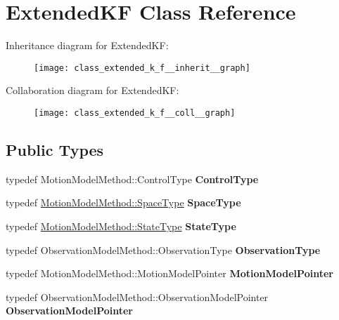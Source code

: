 \hypertarget{class_extended_k_f}{\section{\-Extended\-K\-F \-Class \-Reference}
\label{class_extended_k_f}
}


\-Inheritance diagram for \-Extended\-K\-F\-:
\nopagebreak
\begin{figure}[H]
\begin{center}
\leavevmode
\texttt{[image: class\_extended\_k\_f\_\_inherit\_\_graph]}
\end{center}
\end{figure}


\-Collaboration diagram for \-Extended\-K\-F\-:
\nopagebreak
\begin{figure}[H]
\begin{center}
\leavevmode
\texttt{[image: class\_extended\_k\_f\_\_coll\_\_graph]}
\end{center}
\end{figure}
\subsection*{\-Public \-Types}
\begin{DoxyCompactItemize}
\item 
\hypertarget{class_extended_k_f_a14edd0da9fb8029c87fb0206490e10b3}{typedef \*
\-Motion\-Model\-Method\-::\-Control\-Type {\bfseries \-Control\-Type}}\label{class_extended_k_f_a14edd0da9fb8029c87fb0206490e10b3}

\item 
\hypertarget{class_extended_k_f_a577b350233488edad44145be188b8838}{typedef \*
\hyperlink{class_s_e2_belief_space}{\-Motion\-Model\-Method\-::\-Space\-Type} {\bfseries \-Space\-Type}}\label{class_extended_k_f_a577b350233488edad44145be188b8838}

\item 
\hypertarget{class_extended_k_f_a390468694f87826805dc6b97e37da8ea}{typedef \*
\hyperlink{class_s_e2_belief_space_1_1_state_type}{\-Motion\-Model\-Method\-::\-State\-Type} {\bfseries \-State\-Type}}\label{class_extended_k_f_a390468694f87826805dc6b97e37da8ea}

\item 
\hypertarget{class_extended_k_f_a77ebe1a32d7ec95c8cda310ad4623e8e}{typedef \*
\-Observation\-Model\-Method\-::\-Observation\-Type {\bfseries \-Observation\-Type}}\label{class_extended_k_f_a77ebe1a32d7ec95c8cda310ad4623e8e}

\item 
\hypertarget{class_extended_k_f_a0c9bb13d2de00dd93f574d6387840441}{typedef \*
\-Motion\-Model\-Method\-::\-Motion\-Model\-Pointer {\bfseries \-Motion\-Model\-Pointer}}\label{class_extended_k_f_a0c9bb13d2de00dd93f574d6387840441}

\item 
\hypertarget{class_extended_k_f_aa60b08c63627ba5ddedd2a51b573718d}{typedef \*
\-Observation\-Model\-Method\-::\-Observation\-Model\-Pointer {\bfseries \-Observation\-Model\-Pointer}}\label{class_extended_k_f_aa60b08c63627ba5ddedd2a51b573718d}

\end{DoxyCompactItemize}
